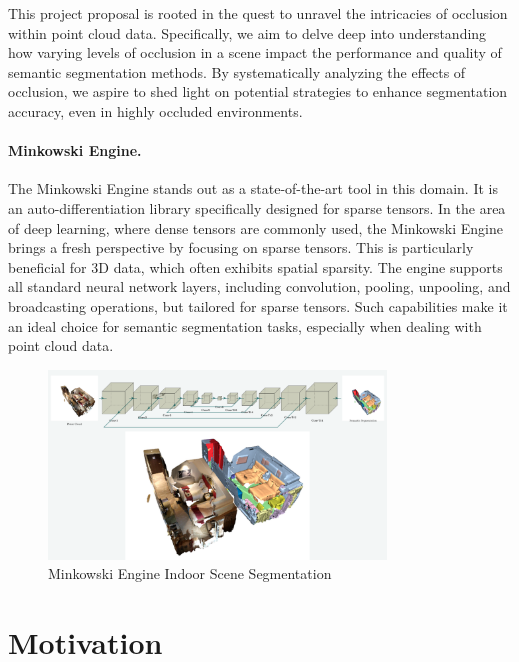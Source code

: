 \documentclass[11pt, a4paper,oneside,chapterprefix=false]{scrbook}
\newcommand{\FIXME}[1]{{\color{RED}{\textbf{FIX}: #1}}}
\begin{document}
\vspace{10pt}

This project proposal is rooted in the quest to unravel the intricacies of occlusion within point cloud data. Specifically, we aim to delve deep into understanding how varying levels of occlusion in a scene impact the performance and quality of semantic segmentation methods. By systematically analyzing the effects of occlusion, we aspire to shed light on potential strategies to enhance segmentation accuracy, even in highly occluded environments.

\paragraph{Minkowski Engine.}

The Minkowski Engine stands out as a state-of-the-art tool in this domain\FIXME{it is no longer a start}. It is an auto-differentiation library specifically designed for sparse tensors. In the area of deep learning, where dense tensors are commonly used, the Minkowski Engine brings a fresh perspective by focusing on sparse tensors. This is particularly beneficial for 3D data, which often exhibits spatial sparsity. The engine supports all standard neural network layers, including convolution, pooling, unpooling, and broadcasting operations, but tailored for sparse tensors. Such capabilities make it an ideal choice for semantic segmentation tasks, especially when dealing with point cloud data.

\begin{figure}[h]
    \centering
    \includegraphics*[width=0.8\textwidth]{figures/Minkowski Engine.png}
    \caption{Minkowski Engine Indoor Scene Segmentation}
    \label{fig:minkowski}
\end{figure}


\section{Motivation} \label{sec:motivation}
\end{document}
